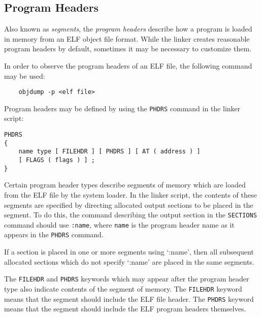 \subsection{Program Headers}
Also known as \textit{segments}, the \textit{program headers} describe how a program is loaded in memory from an ELF object file format. While the linker creates reasonable program headers by default, sometimes it may be necessary to customize them.\cite{gnuldProgramHeaders}

In order to observe the program headers of an ELF file, the following command may be used:
\begin{verbatim}
    objdump -p <elf file>
\end{verbatim}

Program headers may be defined by using the \lstinline|PHDRS| command in the linker script:
\begin{verbatim}
PHDRS
{
    name type [ FILEHDR ] [ PHDRS ] [ AT ( address ) ]
    [ FLAGS ( flags ) ] ;
}
\end{verbatim}

Certain program header types describe segments of memory which are loaded from the ELF file by the system loader. In the linker script, the contents of these segments are specified by directing allocated output sections to be placed in the segment. To do this, the command describing the output section in the \lstinline|SECTIONS| command should use \lstinline|:name|, where \lstinline|name| is the program header name as it appears in the \lstinline|PHDRS| command.\cite{gnuldProgramHeaders}

If a section is placed in one or more segments using `:name', then all subsequent allocated sections which do not specify `:name' are placed in the same segments.\cite{gnuldProgramHeaders}

The \lstinline|FILEHDR| and \lstinline|PHDRS| keywords which may appear after the program header type also indicate contents of the segment of memory. The \lstinline|FILEHDR| keyword means that the segment should include the ELF file header. The \lstinline|PHDRS| keyword means that the segment should include the ELF program headers themselves.\cite{gnuldProgramHeaders}

